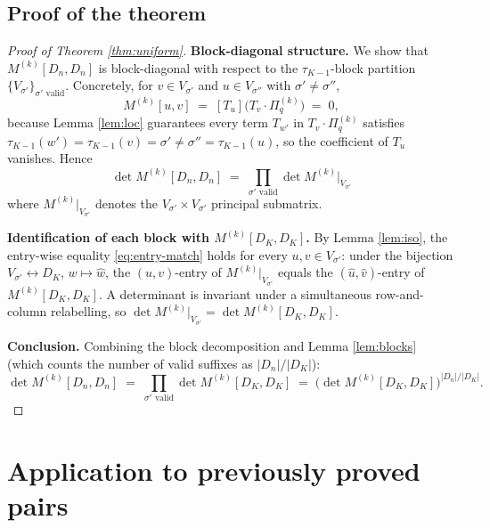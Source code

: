 \documentclass[11pt]{article}
\theoremstyle{definition}
\begin{document}
\subsection{Proof of the theorem}

\begin{proof}[Proof of Theorem \ref{thm:uniform}]
\textbf{Block-diagonal structure.}  We show that $M^{(k)}[D_n, D_n]$ is block-diagonal with respect to the $\tau_{K-1}$-block partition $\{V_{\sigma'}\}_{\sigma' \text{ valid}}$.  Concretely, for $v \in V_{\sigma'}$ and $u \in V_{\sigma''}$ with $\sigma' \neq \sigma''$,
\[
M^{(k)}[u, v] \;=\; [T_u]\!\bigl(T_v \cdot \Pi^{(k)}_q\bigr) \;=\; 0,
\]
because Lemma \ref{lem:loc} guarantees every term $T_{w'}$ in $T_v \cdot \Pi^{(k)}_q$ satisfies $\tau_{K-1}(w') = \tau_{K-1}(v) = \sigma' \neq \sigma'' = \tau_{K-1}(u)$, so the coefficient of $T_u$ vanishes.  Hence
\[
\det M^{(k)}[D_n, D_n] \;=\; \prod_{\sigma' \text{ valid}} \det M^{(k)}\bigl|_{V_{\sigma'}}
\]
where $M^{(k)}|_{V_{\sigma'}}$ denotes the $V_{\sigma'} \times V_{\sigma'}$ principal submatrix.

\textbf{Identification of each block with $M^{(k)}[D_K, D_K]$.}  By Lemma \ref{lem:iso}, the entry-wise equality \eqref{eq:entry-match} holds for every $u, v \in V_{\sigma'}$: under the bijection $V_{\sigma'} \leftrightarrow D_K$, $w \mapsto \widehat w$, the $(u, v)$-entry of $M^{(k)}|_{V_{\sigma'}}$ equals the $(\widehat u, \widehat v)$-entry of $M^{(k)}[D_K, D_K]$.  A determinant is invariant under a simultaneous row-and-column relabelling, so $\det M^{(k)}|_{V_{\sigma'}} = \det M^{(k)}[D_K, D_K]$.

\textbf{Conclusion.}  Combining the block decomposition and Lemma \ref{lem:blocks} (which counts the number of valid suffixes as $|D_n|/|D_K|$):
\[
\det M^{(k)}[D_n, D_n] \;=\; \prod_{\sigma' \text{ valid}} \det M^{(k)}[D_K, D_K] \;=\; \bigl(\det M^{(k)}[D_K, D_K]\bigr)^{|D_n|/|D_K|}.
\]
\end{proof}

\section{Application to previously proved pairs}
\end{document}
